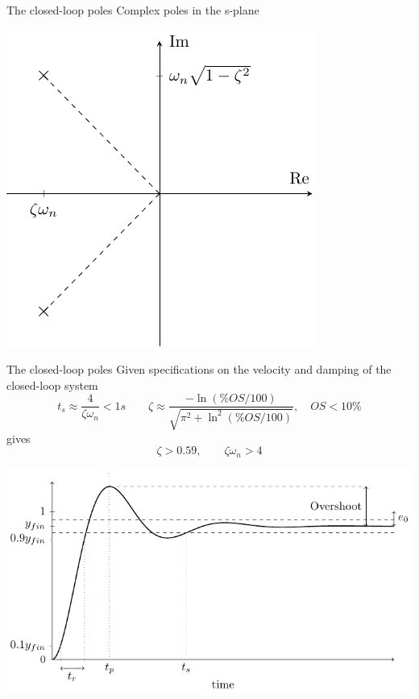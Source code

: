 \documentclass[presentation,aspectratio=169]{beamer}
\begin{document}
\begin{frame}[label={sec:org18d5d4d}]{The closed-loop poles}
Complex poles in the s-plane
\begin{center}
\includegraphics[width=0.45\linewidth]{../../figures/implane-second-order-poles}
\end{center}
\end{frame}

\begin{frame}[label={sec:org695212c}]{The closed-loop poles}
Given specifications on the velocity and damping of the closed-loop system
\[ t_s \approx \frac{4}{\zeta\omega_n} < 1 s \qquad \zeta \approx \frac{-\ln (\%OS/100)}{\sqrt{\pi^2 + \ln^2(\%OS/100)}}, \quad OS < 10\%  \]
gives
\[ \zeta > 0.59,  \qquad \zeta\omega_n > 4\]

\begin{center}
\includegraphics[width=0.6\linewidth]{../../figures/step-response-specifications}
\end{center}
\end{frame}
\end{document}

